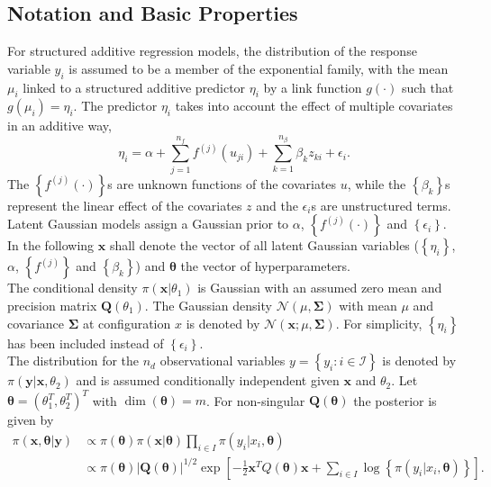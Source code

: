\subsection*{Notation and Basic Properties}
\label{sec:notation}
For structured additive regression models, the distribution of the response variable $y_i$ is assumed to be a member of the exponential family, with the mean $\mu_i$ linked to a structured additive predictor $\eta_i$ by a link function $g\left(\cdot\right)$ such that $g\left(\mu_i\right)=\eta_i$. The predictor $\eta_i$  takes into account the effect of multiple covariates in an additive way,
\begin{equation}\label{eq:predictor}
    \eta_i=\alpha+\sum_{j=1}^{n_f}f^{(j)}\left(u_{ji}\right)+\sum_{k=1}^{n_{\beta}}\beta_kz_{ki}+\epsilon_i.
\end{equation}
The $\left\lbrace f^{(j)}\left(\cdot\right)\right\rbrace$s are unknown functions of the covariates $u$, while the $\left\lbrace\beta_k\right\rbrace$s represent the linear effect of the covariates $z$ and the $\epsilon_i$s are unstructured terms. Latent Gaussian models assign a Gaussian prior to $\alpha$, $\left\lbrace f^{(j)}\left(\cdot\right)\right\rbrace$ and $\left\lbrace\epsilon_i\right\rbrace$. In the following $\pmb{x}$ shall denote the vector of all latent Gaussian variables ($\left\lbrace\eta_i\right\rbrace$, $\alpha$, $\left\lbrace f^{(j)}\right\rbrace$ and $\left\lbrace\beta_k\right\rbrace$) and $\pmb{\theta}$ the vector of hyperparameters. \\
The conditional density $\pi\left(\pmb{x}|\theta_1\right)$ is Gaussian with an assumed zero mean and precision matrix $\pmb{Q}\left(\theta_1\right)$. The Gaussian density $\mathcal{N}\left(\mu,\pmb{\Sigma}\right)$ with mean $\mu$ and covariance $\pmb{\Sigma}$ at configuration $x$ is denoted by $\mathcal{N}\left(\pmb{x};\mu,\pmb{\Sigma}\right)$. For simplicity, $\left\lbrace\eta_i\right\rbrace$ has been included instead of $\left\lbrace\epsilon_i\right\rbrace$. \\
The distribution for the $n_d$ observational variables $y=\left\lbrace y_i:i\in\mathcal{I}\right\rbrace$ is denoted by $\pi\left(\pmb{y}|\pmb{x}, \theta_2\right)$ and is assumed conditionally independent given $\pmb{x}$ and $\theta_2$. Let $\pmb{\theta}=\left(\theta_1^T,\theta_2^T\right)^T$ with $\dim\left(\pmb{\theta}\right)=m$. For non-singular $\pmb{Q}\left(\pmb{\theta}\right)$ the posterior is given by
\begin{align}
    \pi\left(\pmb{x},\pmb{\theta}|\pmb{y}\right)&\propto\pi\left(\pmb{\theta}\right)\pi\left(\pmb{x}|\pmb{\theta}\right)\prod_{i\in I}\pi\left(y_i|x_i,\pmb{\theta}\right) \nonumber\\
    &\propto \pi\left(\pmb{\theta}\right)\left|\pmb{Q}\left(\pmb{\theta}\right)\right|^{1/2}\exp\left[-\frac{1}{2}\pmb{x}^TQ\left(\pmb{\theta}\right)\pmb{x}+\sum_{i\in I}\log\left\lbrace\pi\left(y_i|x_i,\pmb{\theta}\right)\right\rbrace\right].
\end{align}

